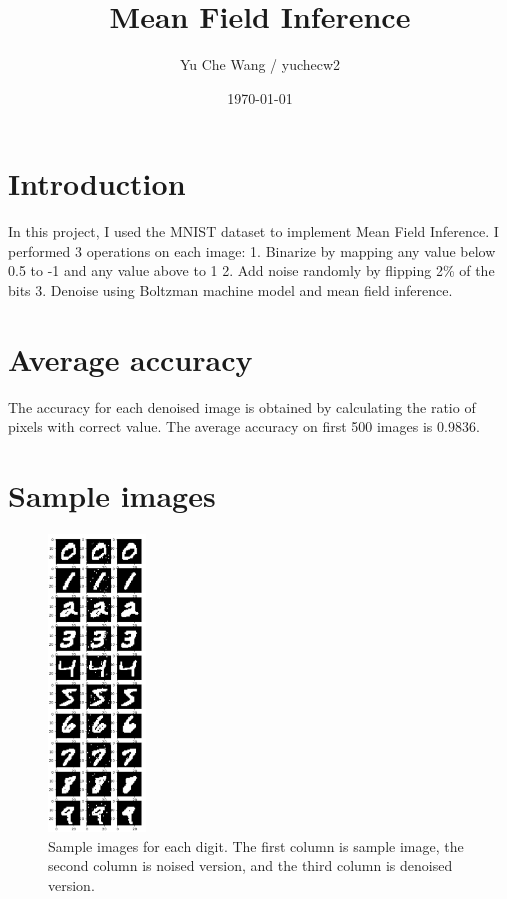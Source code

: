 \documentclass[a4paper]{article}
\title{Mean Field Inference}
\author{Yu Che Wang / yuchecw2}
\date{\today}
\begin{document}
\maketitle
\section{Introduction}
In this project, I used the MNIST dataset to implement Mean Field Inference. I performed 3 operations on each image: 1. Binarize by mapping any value below 0.5 to -1 and any value above to 1 2. Add noise randomly by flipping 2\% of the bits 3. Denoise using Boltzman machine model and mean field inference.

\section{Average accuracy}
The accuracy for each denoised image is obtained by calculating the ratio of pixels with correct value. The average accuracy on first 500 images is 0.9836.

\section{Sample images}
\begin{figure}[H]
\centering
\includegraphics[width=0.23\textwidth]{samples.png}
\caption{\label{fig:data}Sample images for each digit. The first column is sample image, the second column is noised version, and the third column is denoised version.}
\end{figure}
\end{document}
